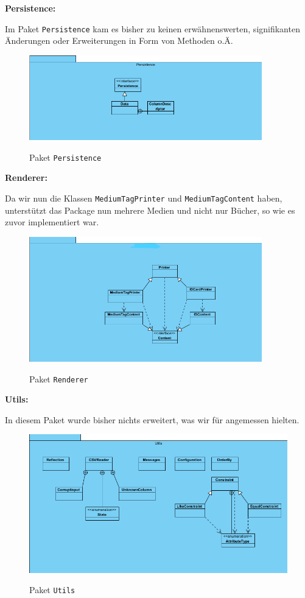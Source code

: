 \documentclass[fontsize=12pt,paper=a4,twoside]{scrartcl}
\begin{document}
\textbf{Persistence:}

Im Paket \texttt{Persistence} kam es bisher zu keinen erwähnenswerten, signifikanten Änderungen oder Erweiterungen in Form von Methoden o.Ä.

\begin{figure} [H] 
\caption{Paket \texttt{Persistence}} \centering
 \includegraphics[width=0.9\textwidth]{Diagramme/Persistence.png} 
 \label{Persistence} 
\end{figure}
\newpage

\textbf{Renderer:}

Da wir nun die Klassen \texttt{MediumTagPrinter} und \texttt{MediumTagContent} haben, unterstützt das Package nun mehrere Medien und nicht nur Bücher, so wie es zuvor implementiert war.
\begin{figure} [H] 
\caption{Paket \texttt{Renderer}} \centering
 \includegraphics[width=0.9\textwidth]{Diagramme/Renderer.png} 
 \label{Renderer} 
\end{figure}

\textbf{Utils:}

In diesem Paket wurde bisher nichts erweitert, was wir für angemessen hielten.
\begin{figure} [H] 
\caption{Paket \texttt{Utils}} \centering
 \includegraphics[width=1\textwidth]{Diagramme/Utils.png} 
 \label{Utils} 
\end{figure}
\end{document}
